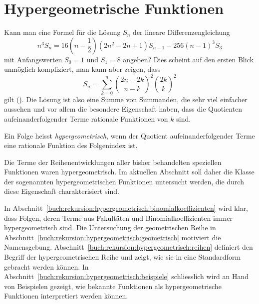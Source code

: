 %
%
%
\section{Hypergeometrische Funktionen
\label{buch:rekursion:section:hypergeometrische-funktion}}
Kann man eine Formel für die Lösung $S_n$ der lineare Differenzengleichung
\[
n^3S_{n}
=
16(n-{\textstyle\frac12})(2n^2-2n+1)S_{n-1}
-256(n-1)^3S_3
\]
mit Anfangswerten $S_0=1$ und $S_1=8$ angeben?
Dies scheint auf den ersten Blick unmöglich kompliziert, man kann aber
zeigen, dass
\begin{equation}
S_n
=
\sum_{k=0}^n 
\binom{2n-2k}{n-k}^2 \binom{2k}{k}^2
\label{buch:rekursion:hypergeometrisch:eqn:Sn}
\end{equation}
gilt (\cite[p.~xi]{buch:ab}).
Die Lösung ist also eine Summe von Summanden, die sehr viel einfacher
aussehen und vor allem die besondere Eigenschaft haben, dass die
Quotienten aufeinanderfolgender Terme rationale Funktionen von $k$
sind.

\begin{definition}
Ein Folge heisst {\em hypergeometrisch}, wenn der Quotient aufeinanderfolgender
%
%
Terme eine rationale Funktion des Folgenindex ist.
\end{definition}

Die Terme der Reihenentwicklungen aller bisher behandelten speziellen
Funktionen waren hypergeometrisch.
Im aktuellen Abschnitt soll daher die Klasse der sogenannten
hypergeometrischen Funktionen untersucht werden, die durch diese
Eigenschaft charakterisiert sind.

In Abschnitt~\ref{buch:rekursion:hypergeometrisch:binomialkoeffizienten}
wird klar, dass Folgen, deren Terme aus Fakultäten und Binomialkoeffizienten
immer hypergeometrisch sind.
%
Die Untersuchung der geometrischen Reihe in
Abschnitt~\ref{buch:rekursion:hypergeometrisch:geometrisch}
%
%
motiviert die Namensgebung.
Abschnitt~\ref{buch:rekursion:hypergeometrisch:reihen}
definiert den Begriff der hypergeometrischen Reihe und zeigt, 
wie sie in eine Standardform gebracht werden können.
In Abschnitt~\ref{buch:rekursion:hypergeometrisch:beispiele}
schliesslich wird an Hand von Beispielen gezeigt, wie bekannte
Funktionen als hypergeometrische Funktionen interpretiert werden können.

